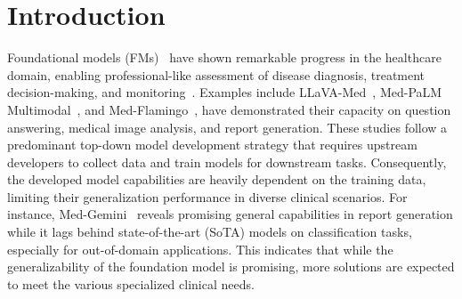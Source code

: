 \section{Introduction}
\label{sec:intro}

Foundational models (FMs)~\cite{zhang2024data, zhou2023comprehensive} have shown remarkable progress in the healthcare domain, enabling professional-like assessment of disease diagnosis, treatment decision-making, and monitoring~\cite{zhang2023text, wang2022medclip, lu2023mi-zero}. 
Examples include LLaVA-Med~\cite{li2023llava}, Med-PaLM Multimodal~\cite{tu2024towards}, and Med-Flamingo~\cite{moor2023med}, have demonstrated their capacity on question answering, medical image analysis, and report generation.
These studies follow a predominant top-down model development strategy that requires upstream developers to collect data and train models for downstream tasks. 
Consequently, the developed model capabilities are heavily dependent on the training data, limiting their generalization performance in diverse clinical scenarios. 
For instance, Med-Gemini~\cite{yang2024advancing} reveals promising general capabilities in report generation while it lags behind state-of-the-art (SoTA) models on classification tasks, especially for out-of-domain applications. 
This indicates that while the generalizability of the foundation model is promising, more solutions are expected to meet the various specialized clinical needs.


